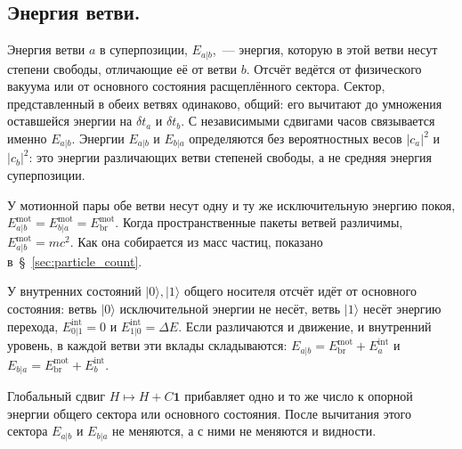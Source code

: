 \documentclass[12pt,a4paper]{article}
\begin{document}
\subsection{Энергия ветви.}
\label{sec:branch_energy}
Энергия ветви $a$ в суперпозиции, $E_{a|b}$,~--- энергия, которую в этой ветви несут степени свободы, отличающие её от ветви $b$. Отсчёт ведётся от физического вакуума или от основного состояния расщеплённого сектора. Сектор, представленный в обеих ветвях одинаково, общий: его вычитают до умножения оставшейся энергии на $\delta t_a$ и $\delta t_b$. С независимыми сдвигами часов связывается именно $E_{a|b}$. Энергии $E_{a|b}$ и $E_{b|a}$ определяются без вероятностных весов $|c_a|^2$ и $|c_b|^2$: это энергии различающих ветви степеней свободы, а не средняя энергия суперпозиции.

У мотионной пары обе ветви несут одну и ту же исключительную энергию покоя, $E_{a|b}^{\mathrm{mot}}=E_{b|a}^{\mathrm{mot}}=E_{\mathrm{br}}^{\mathrm{mot}}$. Когда пространственные пакеты ветвей различимы, $E_{a|b}^{\mathrm{mot}}=mc^2$. Как она собирается из масс частиц, показано в~\S~\ref{sec:particle_count}.

У внутренних состояний $|0\rangle,|1\rangle$ общего носителя отсчёт идёт от основного состояния: ветвь $|0\rangle$ исключительной энергии не несёт, ветвь $|1\rangle$ несёт энергию перехода, $E_{0|1}^{\mathrm{int}}=0$ и $E_{1|0}^{\mathrm{int}}=\Delta E$. Если различаются и движение, и внутренний уровень, в каждой ветви эти вклады складываются: $E_{a|b}=E_{\mathrm{br}}^{\mathrm{mot}}+E_a^{\mathrm{int}}$ и $E_{b|a}=E_{\mathrm{br}}^{\mathrm{mot}}+E_b^{\mathrm{int}}$.

Глобальный сдвиг $H\mapsto H+C\mathbf 1$ прибавляет одно и то же число к опорной энергии общего сектора или основного состояния. После вычитания этого сектора $E_{a|b}$ и $E_{b|a}$ не меняются, а с ними не меняются и видности.
\end{document}
